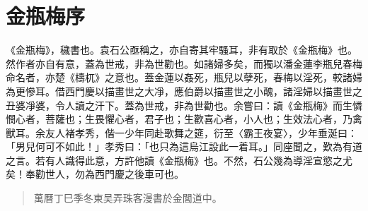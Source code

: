 \chapter*{金瓶梅序}


《金瓶梅》，穢書也。袁石公亟稱之，亦自寄其牢騷耳，非有取於《金瓶梅》也。然作者亦自有意，蓋為世戒，非為世勸也。如諸婦多矣，而獨以潘金蓮李瓶兒春梅命名者，亦楚《檮杌》之意也。蓋金蓮以姦死，瓶兒以孽死，春梅以淫死，較諸婦為更慘耳。借西門慶以描畫世之大凈，應伯爵以描畫世之小醜，諸淫婦以描畫世之丑婆凈婆，令人讀之汗下。蓋為世戒，非為世勸也。余嘗曰：讀《金瓶梅》而生憐憫心者，菩薩也；生畏懼心者，君子也；生歡喜心者，小人也；生效法心者，乃禽獸耳。余友人褚孝秀，偕一少年同赴歌舞之筵，衍至〈霸王夜宴〉，少年垂涎曰：「男兒何可不如此！」孝秀曰：「也只為這烏江設此一着耳。」同座聞之，歎為有道之言。若有人識得此意，方許他讀《金瓶梅》也。不然，石公幾為導淫宣慾之尤矣！奉勸世人，勿為西門慶之後車可也。

\begin{quotation}\begin{flushright}萬曆丁巳季冬東吴弄珠客漫書於金閶道中。\end{flushright}\end{quotation}

